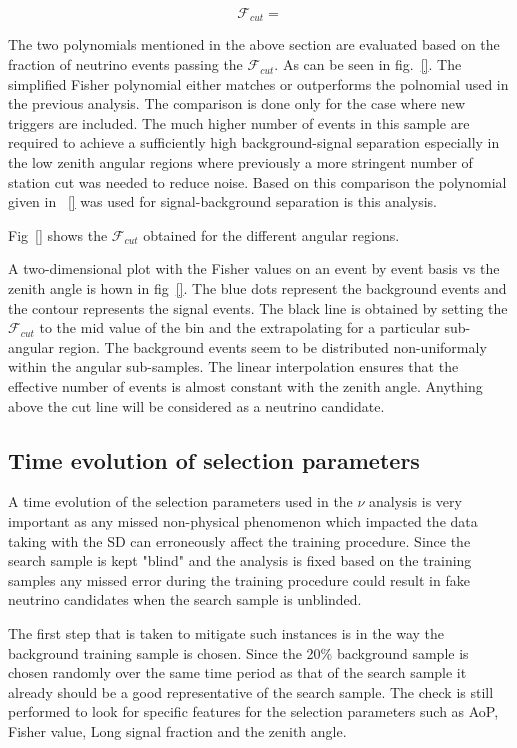 \begin{equation}
  \mathcal{F}_{cut} = 
\end{equation}

The two polynomials mentioned in the above section are evaluated based on the fraction of neutrino events passing the $\mathcal{F}_{cut}$. As can be seen in fig.~\ref{}. The simplified Fisher polynomial either matches or outperforms the polnomial used in the previous analysis. The comparison is done only for the case where new triggers are included. The much higher number of events in this sample are required to achieve a sufficiently high background-signal separation especially in the low zenith angular regions where previously a more stringent number of station cut was needed to reduce noise. Based on this comparison the polynomial given in ~\ref{} was used for signal-background separation is this analysis. 

Fig~\ref{} shows the $\mathcal{F}_{cut}$ obtained for the different angular regions. 

A two-dimensional plot with the Fisher values on an event by event basis vs the zenith angle is hown in fig~\ref{}. The blue dots represent the background events and the contour represents the signal events. The black line is obtained by setting the $\mathcal{F}_{cut}$ to the mid value of the bin and the extrapolating for a particular sub-angular region. The background events seem to be distributed non-uniformaly within the angular sub-samples. The linear interpolation ensures that the effective number of events is almost constant with the zenith angle. Anything above the cut line will be considered as a neutrino candidate. 

\subsection{Time evolution of selection parameters}
\label{subsec:nu_sel_timeev}

A time evolution of the selection parameters used in the $\nu$ analysis is very important as any missed non-physical phenomenon which impacted the data taking with the SD can erroneously affect the training procedure. Since the search sample is kept "blind" and the analysis is fixed based on the training samples any missed error during the training procedure could result in fake neutrino candidates when the search sample is unblinded. 

The first step that is taken to mitigate such instances is in the way the background training sample is chosen. Since the 20\% background sample is chosen randomly over the same time period as that of the search sample it already should be a good representative of the search sample. The check is still performed to look for specific features for the selection parameters such as AoP, Fisher value, Long signal fraction and the zenith angle. 

